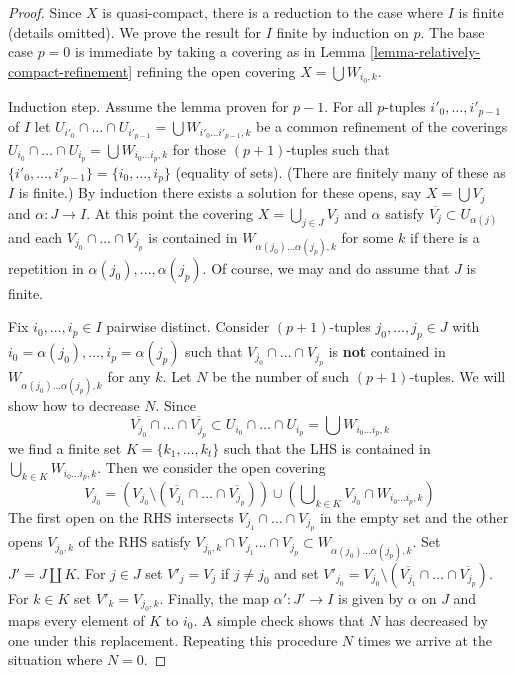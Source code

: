 \begin{proof}
Since $X$ is quasi-compact, there is a reduction to the
case where $I$ is finite (details omitted).
We prove the result for $I$ finite by induction on $p$.
The base case $p = 0$ is immediate by taking a covering as in
Lemma \ref{lemma-relatively-compact-refinement}
refining the open covering $X = \bigcup W_{i_0, k}$.

\medskip\noindent
Induction step. Assume the lemma proven for $p - 1$.
For all $p$-tuples $i'_0, \ldots, i'_{p - 1}$ of $I$ let
$U_{i'_0} \cap \ldots \cap U_{i'_{p - 1}} =
\bigcup W_{i'_0 \ldots i'_{p - 1}, k}$
be a common refinement of the coverings
$U_{i_0} \cap \ldots \cap U_{i_p} = \bigcup W_{i_0 \ldots i_p, k}$
for those $(p + 1)$-tuples such that
$\{i'_0, \ldots, i'_{p - 1}\} = \{i_0, \ldots, i_p\}$ (equality of sets).
(There are finitely many of these as $I$ is finite.)
By induction there exists a solution for these opens, say
$X = \bigcup V_j$ and $\alpha : J \to I$.
At this point the covering $X = \bigcup_{j \in J} V_j$
and $\alpha$ satisfy $\overline{V_j} \subset U_{\alpha(j)}$
and each $V_{j_0} \cap \ldots \cap V_{j_p}$
is contained in $W_{\alpha(j_0) \ldots \alpha(j_p), k}$
for some $k$ if there is a repetition in $\alpha(j_0), \ldots, \alpha(j_p)$.
Of course, we may and do assume that $J$ is finite.

\medskip\noindent
Fix $i_0, \ldots, i_p \in I$ pairwise distinct. Consider $(p + 1)$-tuples
$j_0, \ldots, j_p \in J$ with $i_0 = \alpha(j_0), \ldots, i_p = \alpha(j_p)$
such that $V_{j_0} \cap \ldots \cap V_{j_p}$
is {\bf not} contained in $W_{\alpha(j_0) \ldots \alpha(j_p), k}$ for any $k$.
Let $N$ be the number of such $(p + 1)$-tuples. We will show how to decrease
$N$. Since
$$
\overline{V_{j_0}} \cap \ldots \cap \overline{V_{j_p}} \subset
U_{i_0} \cap \ldots \cap U_{i_p} = \bigcup W_{i_0 \ldots i_p, k}
$$
we find a finite set $K = \{k_1, \ldots, k_t\}$ such that the LHS
is contained in $\bigcup_{k \in K} W_{i_0 \ldots i_p, k}$.
Then we consider the open covering
$$
V_{j_0} =
(V_{j_0} \setminus (\overline{V_{j_1}} \cap \ldots \cap \overline{V_{j_p}}))
\cup (\bigcup\nolimits_{k \in K} V_{j_0} \cap W_{i_0 \ldots i_p, k})
$$
The first open on the RHS intersects $V_{j_1} \cap \ldots \cap V_{j_p}$
in the empty set and the other opens $V_{j_0, k}$ of the RHS
satisfy $V_{j_0, k} \cap V_{j_1} \ldots \cap V_{j_p} \subset
W_{\alpha(j_0) \ldots \alpha(j_p), k}$.
Set $J' = J \amalg K$. For $j \in J$ set $V'_j = V_j$ if $j \not = j_0$
and set $V'_{j_0} =
V_{j_0} \setminus (\overline{V_{j_1}} \cap \ldots \cap \overline{V_{j_p}})$.
For $k \in K$ set $V'_k = V_{j_0, k}$. Finally, the map $\alpha' : J' \to I$
is given by $\alpha$ on $J$ and maps every element of $K$ to $i_0$.
A simple check shows that $N$ has decreased by one under this replacement.
Repeating this procedure $N$ times we arrive at the situation where
$N = 0$.


\end{proof}
